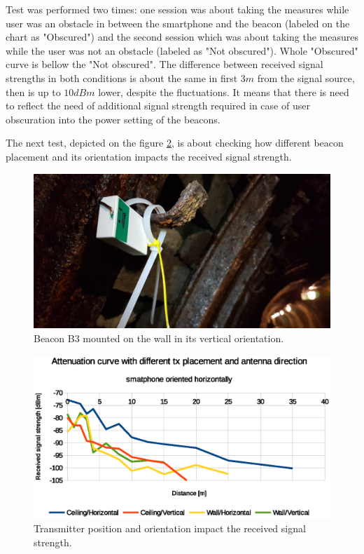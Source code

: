 \documentclass[../main.tex]{subfiles}
\begin{document}
Test was performed two times: one session was about taking the measures while user was an obstacle in between the smartphone and the beacon (labeled on the chart as "Obscured") and the second session which was about taking the measures while the user was not an obstacle (labeled as "Not obscured"). Whole "Obscured" curve is bellow the "Not obscured". The difference between received signal strengths in both conditions is about the same in first $3m$ from the signal source, then is up to $10 dBm$ lower, despite the fluctuations. It means that there is need to reflect the need of additional signal strength required in case of user obscuration into the power setting of the beacons.

The next test, depicted on the figure \ref{fig:tests_case6_tx_placement_and_direction}, is about checking how different beacon placement and its orientation impacts the received signal strength.

\begin{figure}[!htbp]
\includegraphics[width=\textwidth, keepaspectratio]{pictures/beacon_wall_vertical.pdf}
\centering
\caption{Beacon B3 mounted on the wall in its vertical orientation.}
\label{fig:beacon_wall_vertical}
\end{figure}

\begin{figure}[!htbp]
\includegraphics[width=\textwidth, keepaspectratio]{pictures/tests_case6_tx_placement_and_direction}
\centering
\caption{Transmitter position and orientation impact the received signal strength.}
\label{fig:tests_case6_tx_placement_and_direction}
\end{figure}
\end{document}
